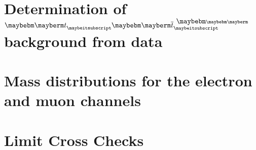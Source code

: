 \chapter{Determination of $\ttbar$ background from data}
\label{sec:appttbar}




\chapter{Mass distributions for the electron and muon channels}
\label{sec:emuratios}


\chapter{Limit Cross Checks}
\label{sec:cutcount}


%

